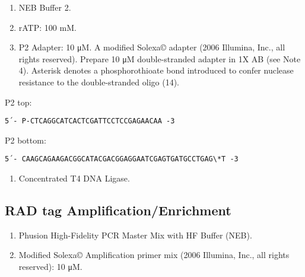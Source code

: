 \documentclass[
  letterpaper,
  DIV=11,
  numbers=noendperiod]{scrreprt}
\providecommand{\tightlist}{%
  \setlength{\itemsep}{0pt}\setlength{\parskip}{0pt}}\usepackage{longtable,booktabs,array}
\begin{document}
\begin{enumerate}
\def\labelenumi{\arabic{enumi}.}
\item
  NEB Buffer 2.
\item
  rATP: 100 mM.
\item
  P2 Adapter: 10 μM. A modified Solexa© adapter (2006 Illumina, Inc.,
  all rights reserved). Prepare 10 μM double-stranded adapter in 1X AB
  (see Note 4). Asterisk denotes a phosphorothioate bond introduced to
  confer nuclease resistance to the double-stranded oligo (14).
\end{enumerate}

\begin{tcolorbox}[enhanced jigsaw, toprule=.15mm, breakable, coltitle=black, leftrule=.75mm, title=\textcolor{quarto-callout-warning-color}{\faExclamationTriangle}\hspace{0.5em}{NOTES}, bottomrule=.15mm, toptitle=1mm, bottomtitle=1mm, colframe=quarto-callout-warning-color-frame, opacityback=0, colback=white, opacitybacktitle=0.6, colbacktitle=quarto-callout-warning-color!10!white, rightrule=.15mm, titlerule=0mm, arc=.35mm, left=2mm]

P2 top:

\begin{verbatim}
5´- P-CTCAGGCATCACTCGATTCCTCCGAGAACAA -3
\end{verbatim}

P2 bottom:

\begin{verbatim}
5´- CAAGCAGAAGACGGCATACGACGGAGGAATCGAGTGATGCCTGAG\*T -3
\end{verbatim}

\end{tcolorbox}

\begin{enumerate}
\def\labelenumi{\arabic{enumi}.}
\setcounter{enumi}{3}
\tightlist
\item
  Concentrated T4 DNA Ligase.
\end{enumerate}

\hypertarget{rad-tag-amplificationenrichment}{%
\subsection{RAD tag
Amplification/Enrichment}\label{rad-tag-amplificationenrichment}}

\begin{enumerate}
\def\labelenumi{\arabic{enumi}.}
\tightlist
\item
  Phusion High-Fidelity PCR Master Mix with HF Buffer (NEB).
\item
  Modified Solexa© Amplification primer mix (2006 Illumina, Inc., all
  rights reserved): 10 μM.
\end{enumerate}
\end{document}
